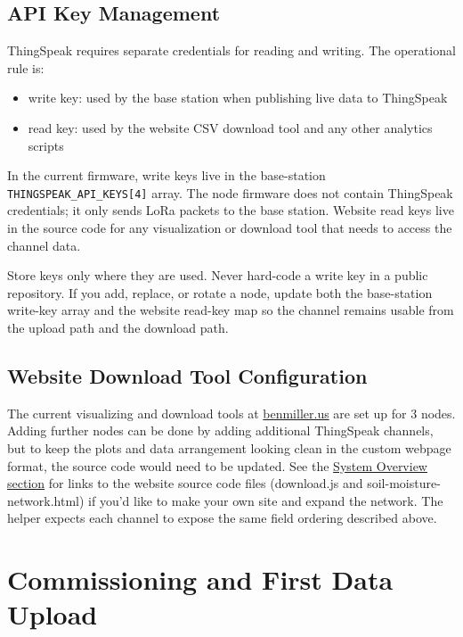 \documentclass[11pt]{article}
\begin{document}
\subsection{API Key Management}\label{subsec:api-key-management}
ThingSpeak requires separate credentials for reading and writing. The operational rule is:
\begin{itemize}
    \item write key: used by the base station when publishing live data to ThingSpeak
    \item read key: used by the website CSV download tool and any other analytics scripts
\end{itemize}

In the current firmware, write keys live in the base-station \texttt{THINGSPEAK\_API\_KEYS[4]} array. The node firmware does not contain ThingSpeak credentials; it only sends LoRa packets to the base station. Website read keys live in the source code for any visualization or download tool that needs to access the channel data.

Store keys only where they are used. Never hard-code a write key in a public repository. If you add, replace, or rotate a node, update both the base-station write-key array and the website read-key map so the channel remains usable from the upload path and the download path.

\subsection{Website Download Tool Configuration}
The current visualizing and download tools at \href{https://benmiller.us}{benmiller.us} are set up for 3 nodes. Adding further nodes can be done by adding additional ThingSpeak channels, but to keep the plots and data arrangement looking clean in the custom webpage format, the source code would need to be updated. See the \hyperref[subsec:high-level]{System Overview section} for links to the website source code files (download.js and soil-moisture-network.html) if you'd like to make your own site and expand the network. The helper expects each channel to expose the same field ordering described above.

\section{Commissioning and First Data Upload}
\end{document}
